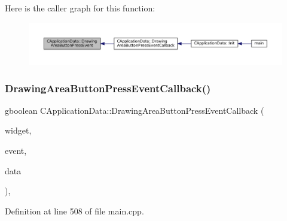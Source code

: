 Here is the caller graph for this function\+:
\nopagebreak
\begin{figure}[H]
\begin{center}
\leavevmode
\includegraphics[width=350pt]{classCApplicationData_ae7516e29f629998e4068ae1584d0237c_icgraph}
\end{center}
\end{figure}
\hypertarget{classCApplicationData_aaa867e992733fa1e88e67c026c8a2947}{}\label{classCApplicationData_aaa867e992733fa1e88e67c026c8a2947} 
\subsubsection{\texorpdfstring{Drawing\+Area\+Button\+Press\+Event\+Callback()}{DrawingAreaButtonPressEventCallback()}}
{\footnotesize\ttfamily gboolean C\+Application\+Data\+::\+Drawing\+Area\+Button\+Press\+Event\+Callback (\begin{DoxyParamCaption}\item[{Gtk\+Widget $\ast$}]{widget,  }\item[{Gdk\+Event\+Button $\ast$}]{event,  }\item[{gpointer}]{data }\end{DoxyParamCaption})\hspace{0.3cm}{\ttfamily [static]}, {\ttfamily [protected]}}



Definition at line 508 of file main.\+cpp.


